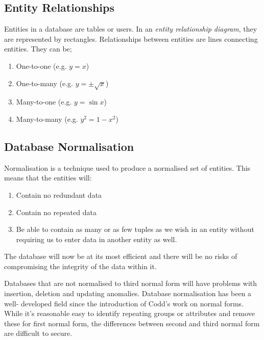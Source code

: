 \documentclass{article}
\begin{document}
\subsection{Entity Relationships}

Entities in a database are tables or users. In an \textit{entity relationship
diagram}, they are represented by rectangles. Relationships between entities are
lines connecting entities. They can be;\begin{enumerate}

    \item One-to-one (e.g. $y=x$)
    
    \item One-to-many (e.g. $y=\pm\sqrt x$)
    
    \item Many-to-one (e.g. $y=\sin x$)
    
    \item Many-to-many (e.g. $y^2=1-x^2$)

\end{enumerate}

\subsection{Database Normalisation}

Normalisation is a technique used to produce a normalised set of entities. This
means that the entities will:\begin{enumerate}

    \item Contain no redundant data

    \item Contain no repeated data

    \item Be able to contain as many or as few tuples as we wish in an entity
        without requiring us to enter data in another entity as well.

\end{enumerate} The database will now be at its most efficient and there will be
no risks of compromising the integrity of the data within it.

Databases that are not normalised to third normal form will have problems with
insertion, deletion and updating anomalies. Database normalisation has been a
well- developed field since the introduction of Codd's work on normal forms.
While it's reasonable easy to identify repeating groups or attributes and remove
these for first normal form, the differences between second and third normal
form are difficult to secure.
\end{document}
